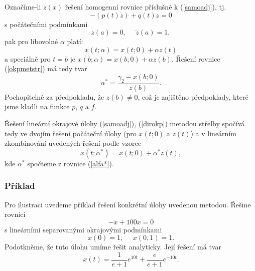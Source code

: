 \documentclass[a4paper, 12pt]{book}
\theoremstyle{definition}
\begin{document}
Označíme-li $z(x)$ řešení homogenní rovnice příslušné k (\ref{samoadj}), tj.
\begin{displaymath}
-(p(t)\dot z)\dot{}+q(t)z=0
\end{displaymath}
s počátečními podmínkami
\begin{displaymath}
z(a) = 0,~~~~~~ \dot z(a)=1,
\end{displaymath}
pak pro libovolné $\alpha$ platí:
\begin{displaymath}
x(t;\alpha) = x(t;0)+\alpha z(t)
\end{displaymath}
a speciálně pro $t=b$ je $x(b;\alpha) = x(b;0)+\alpha z(b)$. Řešení rovnice
(\ref{okpmetstr}) má tedy tvar
\begin{equation}\label{alfa*}
\alpha^*=\frac{\gamma_2-x(b;0)}{z(b)}.
\end{equation}
Pochopitelně za předpokladu, že $z(b)\neq 0$, což je zajištěno předpoklady, které 
jsme kladli na funkce $p$, $q$ a $f$.

Řešení lineární okrajové úlohy (\ref{samoadj}), (\ref{dirokp}) metodou střelby 
spočívá tedy ve dvojím řešení počáteční úlohy (pro $x(t;0)$ a $z(t)$) a v lineárním
zkombinování uvedených řešení podle vzorce
\begin{displaymath}
x(t;\alpha^*) = x(t;0)+\alpha^* z(t),
\end{displaymath}
kde $\alpha^*$ spočteme z rovnice (\ref{alfa*}).

\subsubsection*{Příklad}
Pro ilustraci uvedeme příklad řešení konkrétní úlohy uvedenou metodou. 
Řešme rovnici
\begin{equation}\label{priklmetstr}
-\ddot x + 100 x = 0
\end{equation}
s lineárními separovanými okrajovými podmínkami
\begin{equation}\label{priklOKP1}
x(0)=1, ~~~~~~ x(0{,}1)=1.
\end{equation}
Podotkněme, že tuto úlohu umíme řešit analyticky. Její řešení má tvar
\begin{equation}\label{reseniprikl2}
x(t)=
\frac 1{e+1} e^{10t}+\frac e{e+1} e^{-10t}.
\end{equation}
\end{document}
